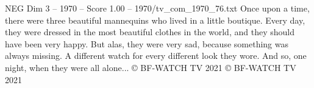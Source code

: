 \begin{textsample}{NEG Dim 3 – 1970 – Score 1.00 – 1970/tv\_com\_1970\_76.txt}  \label{ex:f3_neg_068}
Once upon a time, there were three beautiful mannequins who lived in a little boutique.
Every day, they were dressed in the most beautiful clothes in the world, and they should have been very happy.
But alas, they were very sad, because something was always missing.
A different watch for every different look they wore.
And so, one night, when they were all alone... {\EmojiFont ©} BF-WATCH TV 2021 {\EmojiFont ©} BF-WATCH TV 2021

\end{textsample}
